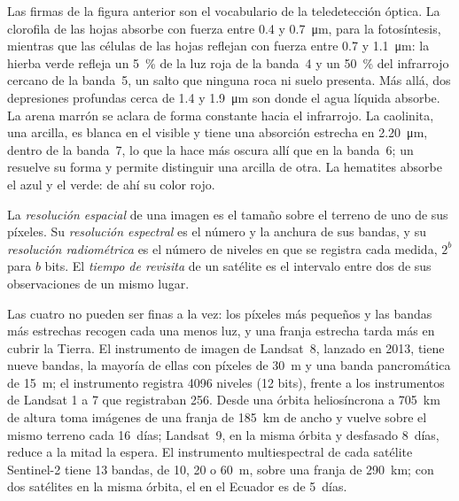 Las firmas de la figura anterior son el vocabulario de la teledetección
óptica. La clorofila de las hojas absorbe con fuerza entre 0.4 y
\qty{0.7}{\micro\metre}, para la fotosíntesis, mientras que las células de las hojas
reflejan con fuerza entre 0.7 y \qty{1.1}{\micro\metre}: la hierba verde refleja un
\qty{5}{\percent} de la luz roja de la banda~4 y un \qty{50}{\percent} del infrarrojo
cercano de la banda~5, un salto que ninguna roca ni suelo presenta. Más allá, dos
depresiones profundas cerca de 1.4 y \qty{1.9}{\micro\metre} son donde el agua
líquida absorbe. La arena marrón se aclara de forma constante hacia el infrarrojo.
La caolinita, una arcilla, es blanca en el visible y tiene una absorción estrecha en
\qty{2.20}{\micro\metre}, dentro de la banda~7, lo que la hace más oscura allí que
en la banda~6; un  resuelve su forma y permite distinguir una arcilla
de otra. La hematites absorbe el azul y el verde: de ahí su color rojo.

\begin{definition}\label{def:b3:remote-sensing-gis:resolutions}
La \emph{resolución espacial} de una imagen es el
tamaño sobre el terreno de uno de sus píxeles. Su \emph{resolución
espectral} es el número y la anchura de sus
bandas, y su \emph{resolución radiométrica} es el
número de niveles en que se registra cada medida, $2^b$ para $b$ bits.
El \emph{tiempo de revisita} de un satélite es el intervalo
entre dos de sus observaciones de un mismo lugar.
\end{definition}

Las cuatro no pueden ser finas a la vez: los píxeles más pequeños y las bandas más estrechas
recogen cada una menos luz, y una franja estrecha tarda más en cubrir la
Tierra. El instrumento de imagen de Landsat~8, lanzado en 2013, tiene nueve bandas, la mayoría de
ellas con píxeles de \qty{30}{m} y una banda pancromática de \qty{15}{m}; el
instrumento registra 4096 niveles (12 bits), frente a los instrumentos de Landsat 1 a 7
que registraban 256. Desde una órbita heliosíncrona a \qty{705}{km} de altura
toma imágenes de una franja de \qty{185}{km} de ancho y vuelve sobre el mismo terreno cada 16~días;
Landsat~9, en la misma órbita y desfasado 8~días, reduce a la mitad la espera.
El instrumento multiespectral de cada satélite Sentinel-2 tiene 13 bandas, de 10, 20
o \qty{60}{m}, sobre una franja de \qty{290}{km}; con dos satélites en la
misma órbita, el  en el Ecuador es de 5~días.

